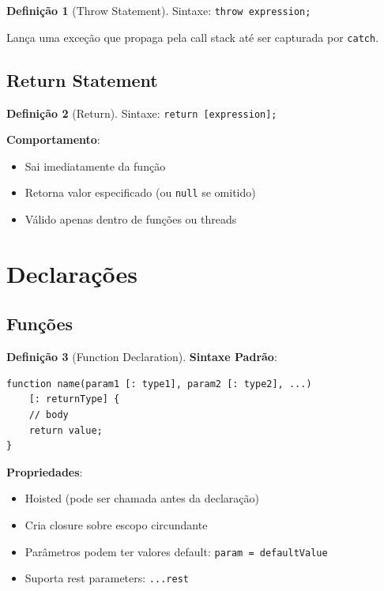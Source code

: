\documentclass[12pt,a4paper]{article}
\theoremstyle{definition}
\newtheorem{definition}{Definição}[section]
\begin{document}
\begin{definition}[Throw Statement]
Sintaxe: \texttt{throw expression;}

Lança uma exceção que propaga pela call stack até ser capturada por \texttt{catch}.
\end{definition}

\subsection{Return Statement}

\begin{definition}[Return]
Sintaxe: \texttt{return [expression];}

\textbf{Comportamento}:
\begin{itemize}
    \item Sai imediatamente da função
    \item Retorna valor especificado (ou \texttt{null} se omitido)
    \item Válido apenas dentro de funções ou threads
\end{itemize}
\end{definition}

\section{Declarações}

\subsection{Funções}

\begin{definition}[Function Declaration]
\textbf{Sintaxe Padrão}:
\begin{verbatim}
function name(param1 [: type1], param2 [: type2], ...)
    [: returnType] {
    // body
    return value;
}
\end{verbatim}

\textbf{Propriedades}:
\begin{itemize}
    \item Hoisted (pode ser chamada antes da declaração)
    \item Cria closure sobre escopo circundante
    \item Parâmetros podem ter valores default: \texttt{param = defaultValue}
    \item Suporta rest parameters: \texttt{...rest}
\end{itemize}
\end{definition}
\end{document}
